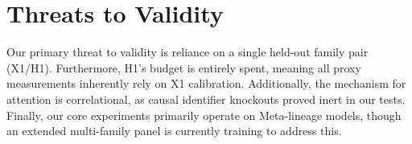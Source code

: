 \section{Threats to Validity}

Our primary threat to validity is reliance on a single held-out family pair (X1/H1). Furthermore, H1's budget is entirely spent, meaning all proxy measurements inherently rely on X1 calibration. Additionally, the mechanism for attention is correlational, as causal identifier knockouts proved inert in our tests. Finally, our core experiments primarily operate on Meta-lineage models, though an extended multi-family panel is currently training to address this.